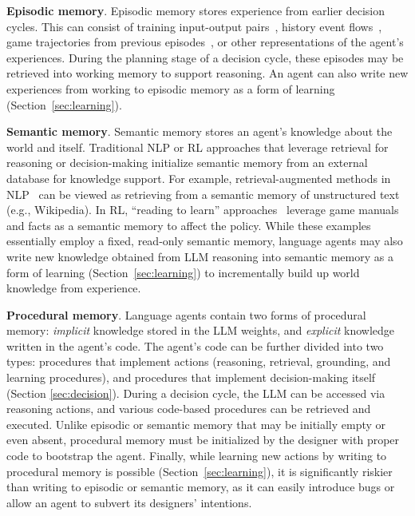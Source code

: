 \documentclass[10pt]{article} %
\begin{document}
\textbf{Episodic memory}. Episodic memory stores experience from earlier decision cycles. This can consist of training input-output pairs~\citep{rubin2021learning}, history event flows~\citep{weston2014memory, park2023generative}, game trajectories from previous episodes~\citep{yao2020keep, tuyls2022multi}, or other representations of the agent's experiences. During the planning stage of a decision cycle, these episodes may be retrieved into working memory to support reasoning. An agent can also write new experiences from working to episodic memory as a form of learning (Section~\ref{sec:learning}).

\textbf{Semantic memory}. Semantic memory stores an agent's knowledge about the world and itself.
Traditional NLP or RL approaches that leverage retrieval for reasoning or decision-making initialize semantic memory from an external database for knowledge support. 
For example, retrieval-augmented methods in NLP~\citep{lewis2020retrieval,borgeaud2022improving, chen2017reading} can be viewed as retrieving from a semantic memory of unstructured text (e.g., Wikipedia). 
In RL, ``reading to learn'' approaches~\citep{branavan2012learning, narasimhan2018deep, wang2021grounding, zhong2021silg} leverage game manuals and facts as a semantic memory to affect the policy. 
While these examples essentially employ a fixed, read-only semantic memory, language agents may also write new knowledge obtained from LLM reasoning into semantic memory as a form of learning (Section~\ref{sec:learning}) to incrementally build up world knowledge from experience.


\textbf{Procedural memory}. Language agents contain two forms of procedural memory: \emph{implicit} knowledge stored in the LLM weights, and \emph{explicit} knowledge written in the agent's code. The agent's code can be further divided into two types: procedures that implement actions (reasoning, retrieval, grounding, and learning procedures), and procedures that implement decision-making itself (Section \ref{sec:decision}). During a decision cycle, the LLM can be accessed via reasoning actions, and various code-based procedures can be retrieved and executed. Unlike episodic or semantic memory that may be initially empty or even absent, procedural memory must be initialized by the designer with proper code to bootstrap the agent. Finally, while learning new actions by writing to procedural memory is possible (Section~\ref{sec:learning}), it is significantly riskier than writing to episodic or semantic memory, as it can easily introduce bugs or allow an agent to subvert its designers' intentions.
\end{document}
